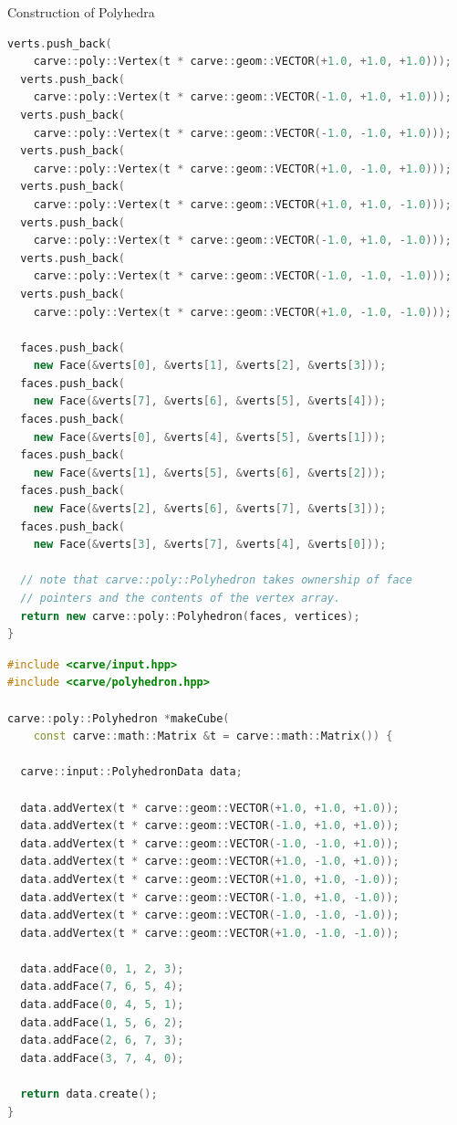 \documentclass{carve}
\begin{document}
\begin{section}{Construction of Polyhedra}
\begin{lstlisting}[float,language=C++,caption=Constructing a cube directly,label=code:cube-direct]
  verts.push_back(
    carve::poly::Vertex(t * carve::geom::VECTOR(+1.0, +1.0, +1.0)));
  verts.push_back(
    carve::poly::Vertex(t * carve::geom::VECTOR(-1.0, +1.0, +1.0)));
  verts.push_back(
    carve::poly::Vertex(t * carve::geom::VECTOR(-1.0, -1.0, +1.0)));
  verts.push_back(
    carve::poly::Vertex(t * carve::geom::VECTOR(+1.0, -1.0, +1.0)));
  verts.push_back(
    carve::poly::Vertex(t * carve::geom::VECTOR(+1.0, +1.0, -1.0)));
  verts.push_back(
    carve::poly::Vertex(t * carve::geom::VECTOR(-1.0, +1.0, -1.0)));
  verts.push_back(
    carve::poly::Vertex(t * carve::geom::VECTOR(-1.0, -1.0, -1.0)));
  verts.push_back(
    carve::poly::Vertex(t * carve::geom::VECTOR(+1.0, -1.0, -1.0)));

  faces.push_back(
    new Face(&verts[0], &verts[1], &verts[2], &verts[3]));
  faces.push_back(
    new Face(&verts[7], &verts[6], &verts[5], &verts[4]));
  faces.push_back(
    new Face(&verts[0], &verts[4], &verts[5], &verts[1]));
  faces.push_back(
    new Face(&verts[1], &verts[5], &verts[6], &verts[2]));
  faces.push_back(
    new Face(&verts[2], &verts[6], &verts[7], &verts[3]));
  faces.push_back(
    new Face(&verts[3], &verts[7], &verts[4], &verts[0]));

  // note that carve::poly::Polyhedron takes ownership of face
  // pointers and the contents of the vertex array.
  return new carve::poly::Polyhedron(faces, vertices);
}
\end{lstlisting}

\begin{lstlisting}[float,language=C++,caption=Constructing a cube using {\codefont carve::input::PolyhedronData}]
#include <carve/input.hpp>
#include <carve/polyhedron.hpp>

carve::poly::Polyhedron *makeCube(
    const carve::math::Matrix &t = carve::math::Matrix()) {

  carve::input::PolyhedronData data;
  
  data.addVertex(t * carve::geom::VECTOR(+1.0, +1.0, +1.0));
  data.addVertex(t * carve::geom::VECTOR(-1.0, +1.0, +1.0));
  data.addVertex(t * carve::geom::VECTOR(-1.0, -1.0, +1.0));
  data.addVertex(t * carve::geom::VECTOR(+1.0, -1.0, +1.0));
  data.addVertex(t * carve::geom::VECTOR(+1.0, +1.0, -1.0));
  data.addVertex(t * carve::geom::VECTOR(-1.0, +1.0, -1.0));
  data.addVertex(t * carve::geom::VECTOR(-1.0, -1.0, -1.0));
  data.addVertex(t * carve::geom::VECTOR(+1.0, -1.0, -1.0));

  data.addFace(0, 1, 2, 3);
  data.addFace(7, 6, 5, 4);
  data.addFace(0, 4, 5, 1);
  data.addFace(1, 5, 6, 2);
  data.addFace(2, 6, 7, 3);
  data.addFace(3, 7, 4, 0);

  return data.create();
}
\end{lstlisting}

\end{section}
\end{document}
